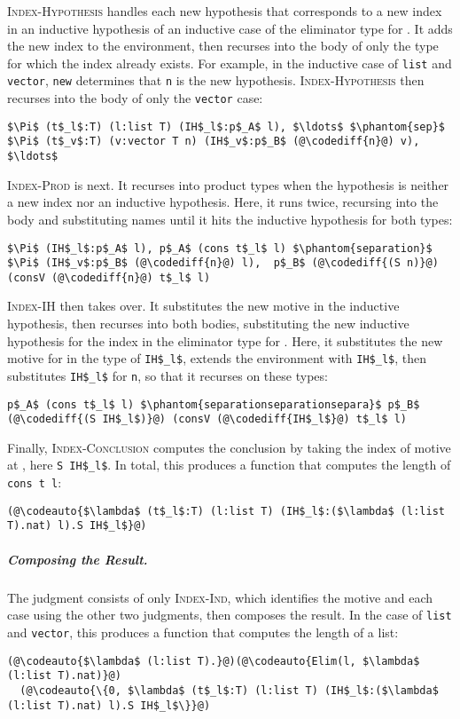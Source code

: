 \textsc{Index-Hypothesis} handles each new hypothesis that corresponds to a new index in an inductive hypothesis
of an inductive case of the eliminator type for \B. It adds the new index to the environment, then recurses into the body of only the
type for which the index already exists. For example, in the inductive case of \lstinline{list} and \lstinline{vector},
\lstinline{new} determines that \lstinline{n} is the new hypothesis.
\textsc{Index-Hypothesis} then recurses into the body of only the \lstinline{vector} case:
\begin{lstlisting}
$\Pi$ (t$_l$:T) (l:list T) (IH$_l$:p$_A$ l), $\ldots$ $\phantom{sep}$ $\Pi$ (t$_v$:T) (v:vector T n) (IH$_v$:p$_B$ (@\codediff{n}@) v), $\ldots$
\end{lstlisting}
\textsc{Index-Prod} is next. It recurses into product types when the hypothesis is neither a new index nor an inductive hypothesis. Here, it runs twice, recursing into the body and substituting names %
until it hits the inductive hypothesis for both types:
\begin{lstlisting}
$\Pi$ (IH$_l$:p$_A$ l), p$_A$ (cons t$_l$ l) $\phantom{separation}$ $\Pi$ (IH$_v$:p$_B$ (@\codediff{n}@) l),  p$_B$ (@\codediff{(S n)}@) (consV (@\codediff{n}@) t$_l$ l)
\end{lstlisting}
\textsc{Index-IH} then takes over. It substitutes the new motive in the inductive hypothesis, then recurses into both bodies, 
substituting the new inductive hypothesis for the index in the eliminator type for \B.
Here, it substitutes the new motive
for  in the type of \lstinline{IH$_l$}, extends the environment with \lstinline{IH$_l$}, then 
substitutes \lstinline{IH$_l$} for \lstinline{n}, so that it recurses on these types:
\begin{lstlisting}
p$_A$ (cons t$_l$ l) $\phantom{separationseparationsepara}$ p$_B$ (@\codediff{(S IH$_l$)}@) (consV (@\codediff{IH$_l$}@) t$_l$ l)
\end{lstlisting}
Finally, \textsc{Index-Conclusion} computes the conclusion by taking the index of motive  at ,
here \lstinline{S IH$_l$}.
In total, this produces a function 
that computes the length of \lstinline{cons t l}:
\begin{lstlisting}
(@\codeauto{$\lambda$ (t$_l$:T) (l:list T) (IH$_l$:($\lambda$ (l:list T).nat) l).S IH$_l$}@)
\end{lstlisting}

\subparagraph*{Composing the Result.}
The  judgment consists of only \textsc{Index-Ind}, which 
identifies the motive and each case using the other two judgments, then composes the result. In the case of \lstinline{list} and \lstinline{vector},
this produces a function that computes the length of a list:
\begin{lstlisting}
(@\codeauto{$\lambda$ (l:list T).}@)(@\codeauto{Elim(l, $\lambda$ (l:list T).nat)}@) 
  (@\codeauto{\{0, $\lambda$ (t$_l$:T) (l:list T) (IH$_l$:($\lambda$ (l:list T).nat) l).S IH$_l$\}}@)
\end{lstlisting}

